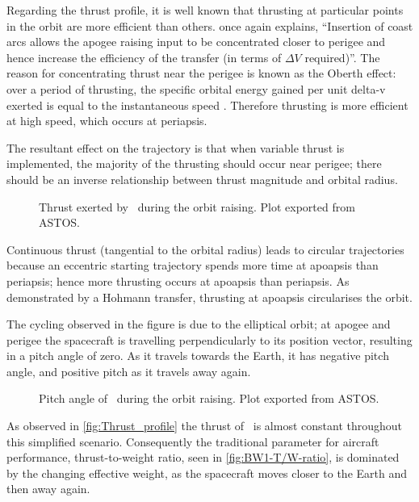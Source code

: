 Regarding the thrust profile, it is well known that thrusting at particular points in the orbit are more efficient than others. \textcite{Kemble2006} once again explains, \enquote{Insertion of coast arcs allows the apogee raising input to be concentrated closer to perigee and hence increase the efficiency of the transfer (in terms of $\Delta V$ required)}. The reason for concentrating thrust near the perigee is known as the Oberth effect: over a period of thrusting, the specific orbital energy gained per unit delta-v exerted is equal to the instantaneous speed \parencite{Oberth1923}. Therefore thrusting is more efficient at high speed, which occurs at periapsis.
 
The resultant effect on the trajectory is that when variable thrust is implemented, the majority of the thrusting should occur near perigee; there should be an inverse relationship between thrust magnitude and orbital radius. 

\begin{figure}
\begin{center}
\end{center}
\caption{Thrust exerted by \BW\ during the orbit raising. Plot exported from ASTOS.}
\label{fig:Thrust_profile}
\end{figure}

Continuous thrust (tangential to the orbital radius) leads to circular trajectories because an eccentric starting trajectory spends more time at apoapsis than periapsis; hence more thrusting occurs at apoapsis than periapsis. As demonstrated by a Hohmann transfer, thrusting at apoapsis circularises the orbit.

The cycling observed in the figure is due to the elliptical orbit; at apogee and perigee the spacecraft is travelling perpendicularly to its position vector, resulting in a pitch angle of zero. As it travels towards the Earth, it has negative pitch angle, and positive pitch as it travels away again.
 
\begin{figure}
\begin{center}
\end{center}
\caption{Pitch angle of \BW\ during the orbit raising. Plot exported from ASTOS.}
\label{fig:BW1-Pitch}
\end{figure}

As observed in \autoref{fig:Thrust_profile} the thrust of \BW\ is almost constant throughout this simplified scenario. Consequently the traditional parameter for aircraft performance, thrust-to-weight ratio, seen in \autoref{fig:BW1-T/W-ratio}, is dominated by the changing effective weight, as the spacecraft moves closer to the Earth and then away again.

